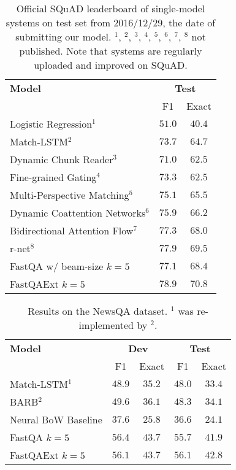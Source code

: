\documentclass[11pt,a4paper]{article}
\begin{document}
\begin{table}[t]
    \centering
    \small
        \begin{tabular}{l c c}
        \toprule
        \textbf{Model} & \multicolumn{2}{c}{\textbf{Test}} \\
        & F1 & Exact \\
        \midrule
        Logistic Regression$^1$ & $51.0$ & $40.4$  \\
        Match-LSTM$^2$ & $73.7$ & $64.7$ \\ 
        Dynamic Chunk Reader$^3$ & $71.0$ & $62.5$ \\
        Fine-grained Gating$^4$ & $73.3$ & $62.5$ \\
        Multi-Perspective Matching$^5$ & $75.1$ & $65.5$ \\
        Dynamic Coattention Networks$^6$ & $75.9$ & $66.2$ \\
        Bidirectional Attention Flow$^7$ & $77.3$ & $68.0$ \\
        r-net$^8$ & $77.9$ & $69.5$ \\
        \midrule
        FastQA w/ beam-size $k=5$ & $77.1$ & $68.4$ \\
        FastQAExt $k=5$ & $\mathbf{78.9}$ & $\mathbf{70.8}$ \\
        \bottomrule
    \end{tabular}
    \caption{Official SQuAD leaderboard of single-model systems on test set from 2016/12/29, the date of submitting our model. $^1$, $^2$, $^3$, $^4$, $^5$, $^6$, $^7$, $^8$ not published. Note that systems are regularly uploaded and improved on SQuAD.}
    \label{tab:squad_test_results}
\end{table}


\begin{table}[t]
    \centering
    \small
    \begin{tabular}{l c c c c}
        \toprule
        \textbf{Model} & \multicolumn{2}{c}{\textbf{Dev}} & \multicolumn{2}{c}{\textbf{Test}} \\
        & F1 & Exact & F1 & Exact \\
        \midrule
        Match-LSTM$^1$ & $48.9$ & $35.2$ & $48.0$ & $33.4$ \\
        BARB$^2$ & $49.6$ & $36.1$ & $48.3$ & $34.1$ \\
        \midrule
        Neural BoW Baseline & $37.6$ & $25.8$ & $36.6$ & $24.1$ \\
        FastQA $k=5$ & $\boldsymbol{56.4}$ & $\boldsymbol{43.7}$ & $55.7$ & $41.9$ \\
        FastQAExt $k=5$ & $56.1$ & $\boldsymbol{43.7}$ & $\boldsymbol{56.1}$ & $\boldsymbol{42.8}$ \\
        \bottomrule
    \end{tabular}
    \caption{Results on the NewsQA dataset. $^1$ was re-implemented by $^2$.}
    \label{tab:news_qa_results}
\end{table}
\end{document}
